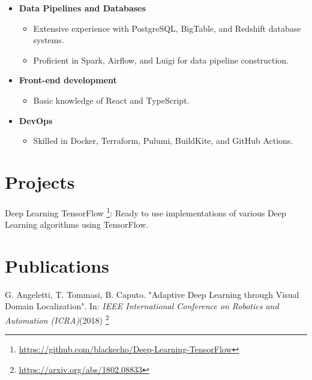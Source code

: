 \documentclass[margin]{res}
\begin{document}
\begin{resume}
\begin{itemize}
            \item \textbf{Data Pipelines and Databases}
            \begin{itemize}
                \item Extensive experience with PostgreSQL, BigTable, and Redshift database systems.
                \item Proficient in Spark, Airflow, and Luigi for data pipeline construction.
            \end{itemize}

            \item \textbf{Front-end development}
            \begin{itemize}
                \item Basic knowledge of React and TypeScript.
            \end{itemize}

            \item \textbf{DevOps}
            \begin{itemize}
                \item Skilled in Docker, Terraform, Pulumi, BuildKite, and GitHub Actions.
            \end{itemize}
        \end{itemize}

        \section{Projects}
        \begin{description}
            \item Deep Learning TensorFlow \footnote{\url{https://github.com/blackecho/Deep-Learning-TensorFlow}}:
                Ready to use implementations of various Deep Learning algorithms using TensorFlow.
        \end{description}

        \section{Publications}
        \begin{description}
            \item G. Angeletti, T. Tommasi, B. Caputo.
                "Adaptive Deep Learning through Visual Domain Localization".
                In: \textit{IEEE International Conference on Robotics and Automation (ICRA)}(2018) \footnote{\url{https://arxiv.org/abs/1802.08833}}
        \end{description}


\end{resume}
\end{document}
